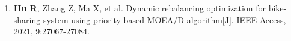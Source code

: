 
\begin{enumerate}
  \renewcommand{\labelenumi}{[\theenumi].}
  \item \textbf{Hu R}, Zhang Z, Ma X, et al. Dynamic rebalancing optimization for bike-sharing system using priority-based MOEA/D algorithm[J]. IEEE Access, 2021, 9:27067-27084.
\end{enumerate}